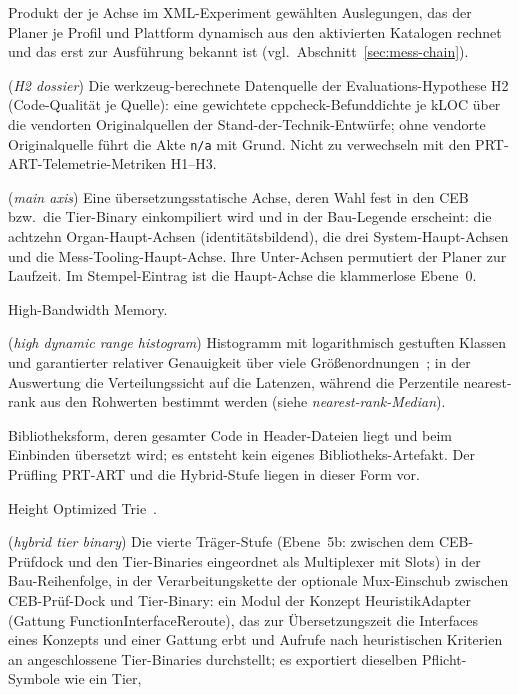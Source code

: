 \begin{description}
  Produkt der je Achse im XML-Experiment gewählten Auslegungen, das der Planer je Profil und Plattform dynamisch
  aus den aktivierten Katalogen rechnet und das erst zur Ausführung bekannt ist
  (vgl.\ Abschnitt~\ref{sec:mess-chain}).
  \item[H2-Akte] (\emph{H2 dossier}) Die werkzeug-berechnete Datenquelle der Evaluations-Hypothese
  H2 (Code-Qualität je Quelle): eine gewichtete cppcheck-Befunddichte je kLOC über die vendorten
  Originalquellen der Stand-der-Technik-Entwürfe; ohne vendorte Originalquelle führt die Akte
  \texttt{n/a} mit Grund. Nicht zu verwechseln mit den PRT-ART-Telemetrie-Metriken H1--H3.
  \item[Haupt-Achse] (\emph{main axis}) Eine übersetzungsstatische Achse, deren Wahl fest in den
  CEB bzw.\ die Tier-Binary einkompiliert wird und in der Bau-Legende erscheint: die achtzehn
  Organ-Haupt-Achsen (identitätsbildend), die drei System-Haupt-Achsen und die
  Mess-Tooling-Haupt-Achse. Ihre Unter-Achsen permutiert der Planer zur Laufzeit. Im
  Stempel-Eintrag ist die Haupt-Achse die klammerlose Ebene~0.
  \item[HBM] High-Bandwidth Memory.
  \item[HDR-Histogramm] (\emph{high dynamic range histogram}) Histogramm mit logarithmisch
  gestuften Klassen und garantierter relativer Genauigkeit über viele
  Größenordnungen~\cite{tene_hdrhistogram}; in der Auswertung die Verteilungssicht auf die
  Latenzen, während die Perzentile nearest-rank aus den Rohwerten bestimmt werden (siehe
  \emph{nearest-rank-Median}).
  \item[header-only] Bibliotheksform, deren gesamter Code in Header-Dateien liegt und beim
  Einbinden übersetzt wird; es entsteht kein eigenes Bibliotheks-Artefakt. Der Prüfling PRT-ART
  und die Hybrid-Stufe liegen in dieser Form vor.
  \item[HOT] Height Optimized Trie~\cite{binna2018hot}.
  \item[Hybrid-Tier-Binary] (\emph{hybrid tier binary}) Die vierte Träger-Stufe (Ebene~5b: zwischen dem
  CEB-Prüfdock und den Tier-Binaries eingeordnet als Multiplexer mit Slots) in der Bau-Reihenfolge, in
  der Verarbeitungskette der optionale Mux-Einschub zwischen CEB-Prüf-Dock und Tier-Binary: ein Modul der
  Konzept HeuristikAdapter (Gattung FunctionInterfaceReroute), das zur Übersetzungszeit die
  Interfaces eines Konzepts und einer Gattung erbt und Aufrufe nach heuristischen Kriterien an
  angeschlossene Tier-Binaries durchstellt; es exportiert dieselben Pflicht-Symbole wie ein Tier,

\end{description}
